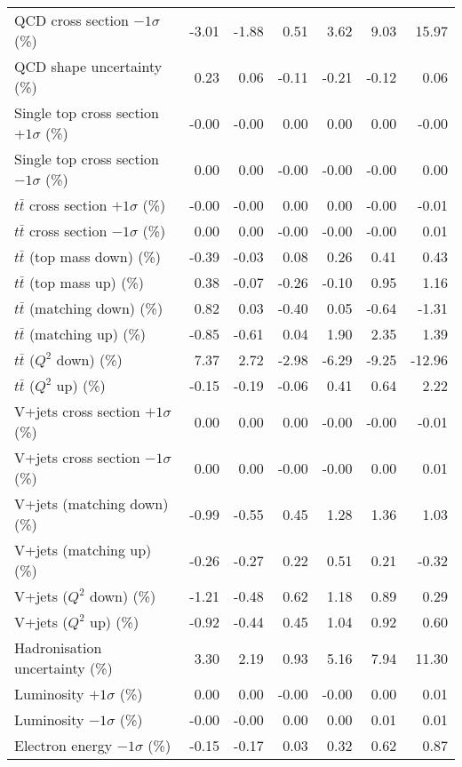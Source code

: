 \begin{table}[htbp]
{\begin{tabular}{lrrrrrr}
QCD cross section \ensuremath{-1\sigma} (\%) & -3.01 & -1.88 & 0.51 & 3.62 & 9.03 & 15.97 \\ 
QCD shape uncertainty (\%) & 0.23 & 0.06 & -0.11 & -0.21 & -0.12 & 0.06 \\ 
Single top cross section $+1\sigma$ (\%) & -0.00 & -0.00 & 0.00 & 0.00 & 0.00 & -0.00 \\ 
Single top cross section $-1\sigma$ (\%) & 0.00 & 0.00 & -0.00 & -0.00 & -0.00 & 0.00 \\ 
$t\bar{t}$ cross section $+1\sigma$ (\%) & -0.00 & -0.00 & 0.00 & 0.00 & -0.00 & -0.01 \\ 
$t\bar{t}$ cross section $-1\sigma$ (\%) & 0.00 & 0.00 & -0.00 & -0.00 & -0.00 & 0.01 \\ 
$t\bar{t}$ (top mass down) (\%) & -0.39 & -0.03 & 0.08 & 0.26 & 0.41 & 0.43 \\ 
$t\bar{t}$ (top mass up) (\%) & 0.38 & -0.07 & -0.26 & -0.10 & 0.95 & 1.16 \\ 
$t\bar{t}$ (matching down) (\%) & 0.82 & 0.03 & -0.40 & 0.05 & -0.64 & -1.31 \\ 
$t\bar{t}$ (matching up) (\%) & -0.85 & -0.61 & 0.04 & 1.90 & 2.35 & 1.39 \\ 
$t\bar{t}$ ($Q^{2}$ down) (\%) & 7.37 & 2.72 & -2.98 & -6.29 & -9.25 & -12.96 \\ 
$t\bar{t}$ ($Q^{2}$ up) (\%) & -0.15 & -0.19 & -0.06 & 0.41 & 0.64 & 2.22 \\ 
V+jets cross section \ensuremath{+1\sigma} (\%) & 0.00 & 0.00 & 0.00 & -0.00 & -0.00 & -0.01 \\ 
V+jets cross section \ensuremath{-1\sigma} (\%) & 0.00 & 0.00 & -0.00 & -0.00 & 0.00 & 0.01 \\ 
V+jets (matching down) (\%) & -0.99 & -0.55 & 0.45 & 1.28 & 1.36 & 1.03 \\ 
V+jets (matching up) (\%) & -0.26 & -0.27 & 0.22 & 0.51 & 0.21 & -0.32 \\ 
V+jets ($Q^{2}$ down) (\%) & -1.21 & -0.48 & 0.62 & 1.18 & 0.89 & 0.29 \\ 
V+jets ($Q^{2}$ up) (\%) & -0.92 & -0.44 & 0.45 & 1.04 & 0.92 & 0.60 \\ 
Hadronisation uncertainty (\%) & 3.30 & 2.19 & 0.93 & 5.16 & 7.94 & 11.30 \\ 
Luminosity $+1\sigma$ (\%) & 0.00 & 0.00 & -0.00 & -0.00 & 0.00 & 0.01 \\ 
Luminosity $-1\sigma$ (\%) & -0.00 & -0.00 & 0.00 & 0.00 & 0.01 & 0.01 \\ 
Electron energy $-1\sigma$ (\%) & -0.15 & -0.17 & 0.03 & 0.32 & 0.62 & 0.87 \\ 

\end{tabular}}
\end{table}
